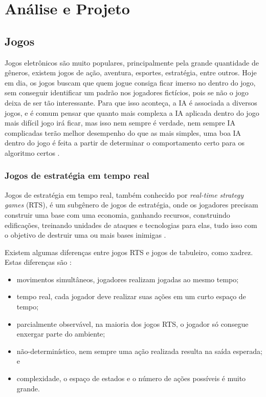 \chapter{\label{chap:ativ}Análise e Projeto}

\section{Jogos}
Jogos eletrônicos são muito populares, principalmente pela grande quantidade de gêneros, existem jogos de ação, aventura, esportes, estratégia, entre outros. Hoje em dia, os jogos buscam que quem jogue consiga ficar imerso no dentro do jogo, sem conseguir identificar um padrão nos jogadores fictícios, pois se não o jogo deixa de ser tão interessante. Para que isso aconteça, a IA é associada a diversos jogos, e é comum pensar que quanto mais complexa a IA aplicada dentro do jogo mais difícil jogo irá ficar, mas isso nem sempre é verdade, nem sempre IA complicadas terão melhor desempenho do que as mais simples, uma boa IA dentro do jogo é feita a partir de determinar o comportamento certo para os algoritmo certos \cite{millington2009artificial}.

\subsection{Jogos de estratégia em tempo real}

Jogos de estratégia em tempo real, também conhecido por \textit{real-time strategy games} (RTS), é um subgênero de jogos de estratégia, onde os jogadores precisam construir uma base com uma economia, ganhando recursos, construindo edificações, treinando unidades de ataques e tecnologias para elas, tudo isso com o objetivo de destruir uma ou mais bases inimigas \cite{ontanon2013survey, buro2012real}. 

Existem algumas diferenças entre jogos RTS e jogos de tabuleiro, como xadrez. Estas diferenças são \cite{ontanon2013survey}:

\begin{itemize}
	\item movimentos simultâneos, jogadores realizam jogadas ao mesmo tempo;
	\item tempo real, cada jogador deve realizar suas ações em um curto espaço de tempo;
	\item parcialmente observável, na maioria dos jogos RTS, o jogador só consegue enxergar parte do ambiente;
	\item não-determinístico, nem sempre uma ação realizada resulta na saída esperada; e
	\item complexidade, o espaço de estados e o número de ações possíveis é muito grande.
\end{itemize} 


